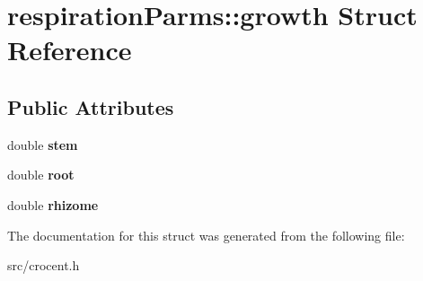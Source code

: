 \hypertarget{structrespiration_parms_1_1growth}{\section{respiration\-Parms\-:\-:growth Struct Reference}
\label{structrespiration_parms_1_1growth}
}
\subsection*{Public Attributes}
\begin{DoxyCompactItemize}
\item 
\hypertarget{structrespiration_parms_1_1growth_a6b43275c6a1ef6c998d206d738451d1e}{double {\bfseries stem}}\label{structrespiration_parms_1_1growth_a6b43275c6a1ef6c998d206d738451d1e}

\item 
\hypertarget{structrespiration_parms_1_1growth_aa67743ff75fe8ab60016871ab63ede79}{double {\bfseries root}}\label{structrespiration_parms_1_1growth_aa67743ff75fe8ab60016871ab63ede79}

\item 
\hypertarget{structrespiration_parms_1_1growth_a79da819723d0941f338b9e97be037dfb}{double {\bfseries rhizome}}\label{structrespiration_parms_1_1growth_a79da819723d0941f338b9e97be037dfb}

\end{DoxyCompactItemize}


The documentation for this struct was generated from the following file\-:\begin{DoxyCompactItemize}
\item 
src/crocent.\-h\end{DoxyCompactItemize}
